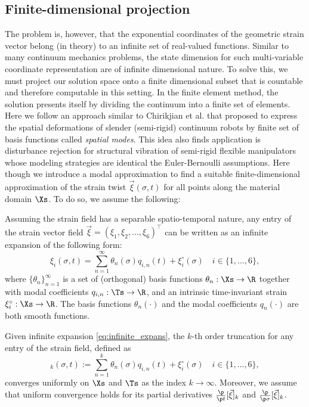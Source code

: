\subsection{Finite-dimensional projection}
The problem is, however, that the exponential coordinates of the geometric strain vector belong (in theory) to an infinite set of real-valued functions. Similar to many continuum mechanics problems, the state dimension for such multi-variable coordinate representation are of infinite dimensional nature. To solve this, we must project our solution space onto a finite dimensional subset that is countable and therefore computable in this setting. In the finite element method, the solution presents itself by dividing the continuum into a finite set of elements. Here we follow an approach similar to Chirikjian et al. \cite{Chirikjian1991,Chirikjian1992} that proposed to express the spatial deformations of slender (semi-rigid) continuum robots by finite set of basis functions called \textit{spatial modes}. This idea also finds application is disturbance rejection for structural vibration of semi-rigid flexible manipulators whose modeling strategies are identical the Euler-Bernoulli assumptions. Here though we introduce a modal approximation to find a suitable finite-dimensional approximation of the strain twist $\vec{\xi}(\sigma,t)$ for all points along the material domain $\Xs$. To do so, we assume the following: %
\begin{asm}
\vspace{1mm}
Assuming the strain field has a separable spatio-temporal nature, any entry of the strain vector field $\vec{\xi} = \left( \xi_1, \xi_2, ..., \xi_6 \right)^\top$ can be written as an infinite expansion of the following form:
%
\begin{equation}
\xi_i(\sigma,t) = \sum_{n=1}^\infty \theta_{n}(\sigma)q_{i,n}(t) + \xi^\circ_{i}(\sigma) \quad i\in\{1,\hdots,6\},
\label{eq:infinite_expans}
\end{equation}
%
where $\{\theta_{n}\}^\infty_{n=1}$ is a set of (orthogonal) basis functions $\theta_{n}: \Xs \to \R$ together with modal coefficients $q_{i,n}: \Ts \to \R$, and an intrinsic time-invariant strain $\xi^\circ_{i}: \Xs \to \R$. The basis functions $\theta_{n}(\cdot)$ and the modal coefficients $q_n(\cdot)$ are both smooth functions.
\end{asm}

\begin{asm}
Given infinite expansion \eqref{eq:infinite_expans}, the $k$-th order truncation for any entry of the strain field, defined as
%
\begin{equation}
[\xi_i]_k(\sigma,t) := \sum_{n=1}^k \theta_n(\sigma)q_{i,n}(t) + \xi^\circ_{i}(\sigma) \quad i\in\{1,\hdots,6\},
\end{equation}
%
converges uniformly on $\Xs$ and $\Ts$ as the index $k \to \infty$. Moreover, we assume that uniform convergence holds for its partial derivatives $\tfrac{\p}{\p t} [\vec{\xi}]_k$ and $\tfrac{\p}{\p \sigma} [\vec{\xi}]_k$.
\end{asm}

